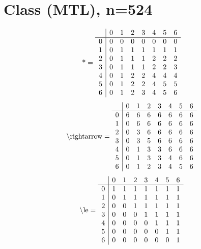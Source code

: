 \documentclass[11pt]{article}
\begin{document}
\section{Class (MTL), n=524}
\[\text{*} = 
\begin{array}{r | r r r r r r r}
 & 0 & 1 & 2 & 3 & 4 & 5 & 6 \\ \hline
0 & 0 & 0 & 0 & 0 & 0 & 0 & 0 \\
1 & 0 & 1 & 1 & 1 & 1 & 1 & 1 \\
2 & 0 & 1 & 1 & 1 & 2 & 2 & 2 \\
3 & 0 & 1 & 1 & 1 & 2 & 2 & 3 \\
4 & 0 & 1 & 2 & 2 & 4 & 4 & 4 \\
5 & 0 & 1 & 2 & 2 & 4 & 5 & 5 \\
6 & 0 & 1 & 2 & 3 & 4 & 5 & 6 \\
\end{array}
\]
\[\text{\textbackslash rightarrow} = 
\begin{array}{r | r r r r r r r}
 & 0 & 1 & 2 & 3 & 4 & 5 & 6 \\ \hline
0 & 6 & 6 & 6 & 6 & 6 & 6 & 6 \\
1 & 0 & 6 & 6 & 6 & 6 & 6 & 6 \\
2 & 0 & 3 & 6 & 6 & 6 & 6 & 6 \\
3 & 0 & 3 & 5 & 6 & 6 & 6 & 6 \\
4 & 0 & 1 & 3 & 3 & 6 & 6 & 6 \\
5 & 0 & 1 & 3 & 3 & 4 & 6 & 6 \\
6 & 0 & 1 & 2 & 3 & 4 & 5 & 6 \\
\end{array}
\]
\[\text{\textbackslash le} = 
\begin{array}{r | r r r r r r r}
 & 0 & 1 & 2 & 3 & 4 & 5 & 6 \\ \hline
0 & 1 & 1 & 1 & 1 & 1 & 1 & 1 \\
1 & 0 & 1 & 1 & 1 & 1 & 1 & 1 \\
2 & 0 & 0 & 1 & 1 & 1 & 1 & 1 \\
3 & 0 & 0 & 0 & 1 & 1 & 1 & 1 \\
4 & 0 & 0 & 0 & 0 & 1 & 1 & 1 \\
5 & 0 & 0 & 0 & 0 & 0 & 1 & 1 \\
6 & 0 & 0 & 0 & 0 & 0 & 0 & 1 \\
\end{array}
\]
\end{document}
